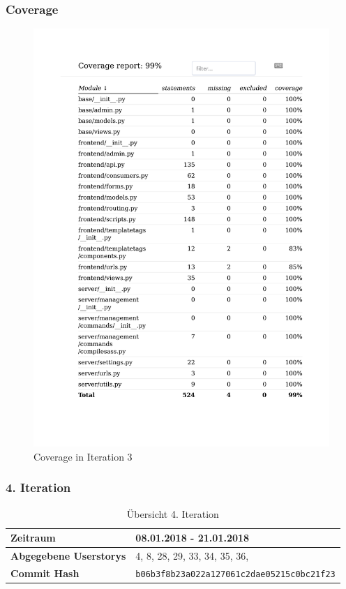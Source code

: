 \subsubsection{Coverage}
\begin{figure}[H]
	\centering
\includegraphics[width=.9\textwidth]{test_output/03_iteration_coverage.pdf}
	\caption{Coverage in Iteration 3}
\end{figure}

\subsubsection{4. Iteration}
\begin{table}[H]
\begin{center}
	\begin{tabular}{| l | l |}
		\hline
		\textbf{Zeitraum} & 08.01.2018 - 21.01.2018\\\hline
		\textbf{Abgegebene Userstorys} & 4, 8, 28, 29, 33, 34, 35, 36, \\\hline
		\textbf{Commit Hash} & \texttt{b06b3f8b23a022a127061c2dae05215c0bc21f23} \\\hline
	\end{tabular}
	\caption{Übersicht 4. Iteration}
\end{center}
\end{table}
